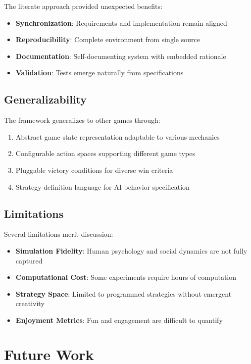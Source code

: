 \documentclass[sigconf]{acmart}
\begin{document}
The literate approach provided unexpected benefits:
\begin{itemize}
\item \textbf{Synchronization}: Requirements and implementation remain aligned
\item \textbf{Reproducibility}: Complete environment from single source
\item \textbf{Documentation}: Self-documenting system with embedded rationale
\item \textbf{Validation}: Tests emerge naturally from specifications
\end{itemize}

\subsection{Generalizability}

The framework generalizes to other games through:
\begin{enumerate}
\item Abstract game state representation adaptable to various mechanics
\item Configurable action spaces supporting different game types
\item Pluggable victory conditions for diverse win criteria
\item Strategy definition language for AI behavior specification
\end{enumerate}

\subsection{Limitations}

Several limitations merit discussion:
\begin{itemize}
\item \textbf{Simulation Fidelity}: Human psychology and social dynamics are not fully captured
\item \textbf{Computational Cost}: Some experiments require hours of computation
\item \textbf{Strategy Space}: Limited to programmed strategies without emergent creativity
\item \textbf{Enjoyment Metrics}: Fun and engagement are difficult to quantify
\end{itemize}

\section{Future Work}
\end{document}
